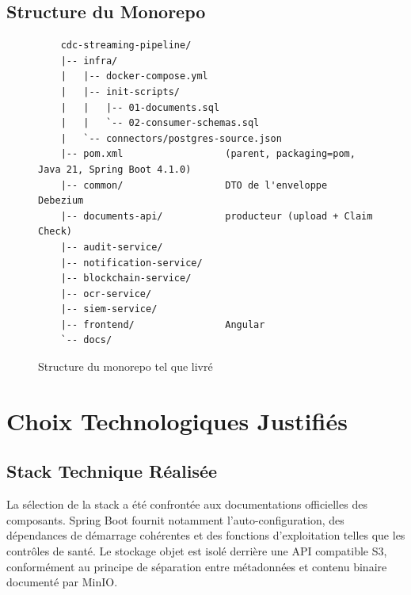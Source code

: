 \documentclass[12pt,a4paper,openany]{report}
\begin{document}
    \section{Structure du Monorepo}

    \begin{figure}[H]
    \centering
    \begin{verbatim}
    cdc-streaming-pipeline/
    |-- infra/
    |   |-- docker-compose.yml
    |   |-- init-scripts/
    |   |   |-- 01-documents.sql
    |   |   `-- 02-consumer-schemas.sql
    |   `-- connectors/postgres-source.json
    |-- pom.xml                  (parent, packaging=pom, Java 21, Spring Boot 4.1.0)
    |-- common/                  DTO de l'enveloppe Debezium
    |-- documents-api/           producteur (upload + Claim Check)
    |-- audit-service/
    |-- notification-service/
    |-- blockchain-service/
    |-- ocr-service/
    |-- siem-service/
    |-- frontend/                Angular
    `-- docs/
    \end{verbatim}
    \caption{Structure du monorepo tel que livr\'e}
    \end{figure}

    \chapter{Choix Technologiques Justifi\'es}

    \section{Stack Technique R\'ealis\'ee}

    La s\'election de la stack a \'et\'e confront\'ee aux documentations officielles des composants. Spring Boot fournit notamment l'auto-configuration, des d\'ependances de d\'emarrage coh\'erentes et des fonctions d'exploitation telles que les contr\^oles de sant\'e\cite{springboot}. Le stockage objet est isol\'e derri\`ere une API compatible S3, conform\'ement au principe de s\'eparation entre m\'etadonn\'ees et contenu binaire document\'e par MinIO\cite{minio-docs}.
\end{document}
